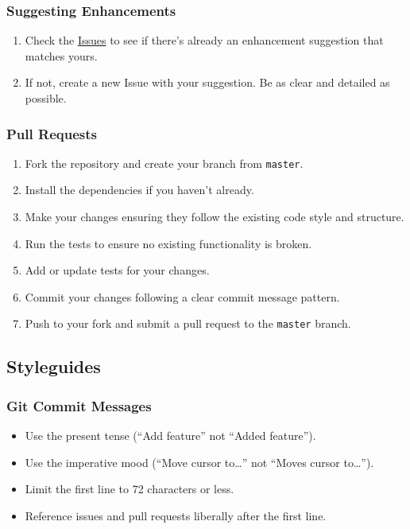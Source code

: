 \documentclass[
]{article}
\providecommand{\tightlist}{%
  \setlength{\itemsep}{0pt}\setlength{\parskip}{0pt}}
\begin{document}
\subsubsection{Suggesting Enhancements}\label{suggesting-enhancements}

\begin{enumerate}
\def\labelenumi{\arabic{enumi}.}
\tightlist
\item
  Check the
  \href{https://github.com/Yczar/test-driven-dart/issues}{Issues} to see
  if there's already an enhancement suggestion that matches yours.
\item
  If not, create a new Issue with your suggestion. Be as clear and
  detailed as possible.
\end{enumerate}

\subsubsection{Pull Requests}\label{pull-requests}

\begin{enumerate}
\def\labelenumi{\arabic{enumi}.}
\tightlist
\item
  Fork the repository and create your branch from \texttt{master}.
\item
  Install the dependencies if you haven't already.
\item
  Make your changes ensuring they follow the existing code style and
  structure.
\item
  Run the tests to ensure no existing functionality is broken.
\item
  Add or update tests for your changes.
\item
  Commit your changes following a clear commit message pattern.
\item
  Push to your fork and submit a pull request to the \texttt{master}
  branch.
\end{enumerate}

\subsection{Styleguides}\label{styleguides}

\subsubsection{Git Commit Messages}\label{git-commit-messages}

\begin{itemize}
\tightlist
\item
  Use the present tense (``Add feature'' not ``Added feature'').
\item
  Use the imperative mood (``Move cursor to\ldots{}'' not ``Moves cursor
  to\ldots{}'').
\item
  Limit the first line to 72 characters or less.
\item
  Reference issues and pull requests liberally after the first line.
\end{itemize}
\end{document}
